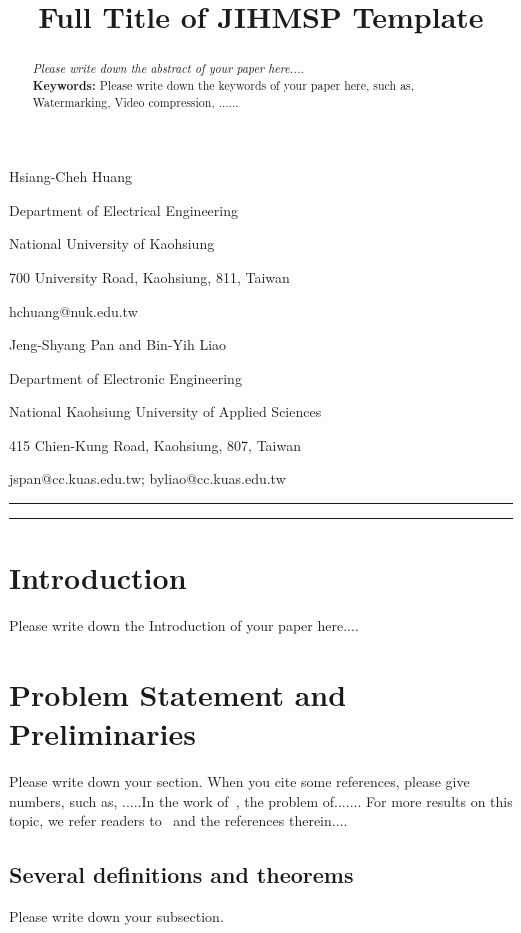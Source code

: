 \documentclass[12pt,a4paper]{jihmsp}
\title[Short Running Title]
{Full Title of JIHMSP Template}
\author[H.C. Huang, J.S. Pan and B.Y. Liao]{}
\begin{document}
	
	\maketitle
	
	\centerline{Hsiang-Cheh Huang}
	\medskip
	{\footnotesize
		\centerline{Department of Electrical Engineering}
		\centerline{National University of Kaohsiung}
		\centerline{700 University Road, Kaohsiung, 811, Taiwan}
		\centerline{hchuang@nuk.edu.tw} }
	\medskip
	
	\centerline{Jeng-Shyang Pan and Bin-Yih Liao}
	\medskip
	{\footnotesize
		\centerline{Department of Electronic Engineering}
		\centerline{National Kaohsiung University of Applied Sciences}
		\centerline{415 Chien-Kung Road, Kaohsiung, 807, Taiwan}
		\centerline{jspan@cc.kuas.edu.tw; byliao@cc.kuas.edu.tw} }
	\medskip
	
	
	
	
	
	\rule{15cm}{1pt}
	
	\begin{abstract}
		
		{\em Please write down the abstract of your paper here....}\\
		{\bf Keywords:} Please write down the keywords of your paper here, such as, Watermarking, Video compression, ......
		
	\end{abstract}
	
	\rule{15cm}{1pt}
	
	\section{Introduction}
	
	Please write down the Introduction of your paper here....
	
	\section{Problem Statement and Preliminaries}
	
	Please write down your section. When you cite some references,
	please give numbers, such as, .....In the work of~\cite{1,2,3,5}, the problem of.......
	For more results on this topic, we refer readers to~\cite{1,4,5,7} and the references therein....
	
	\subsection{Several definitions and theorems}
	Please write down your subsection.
	
\end{document}
